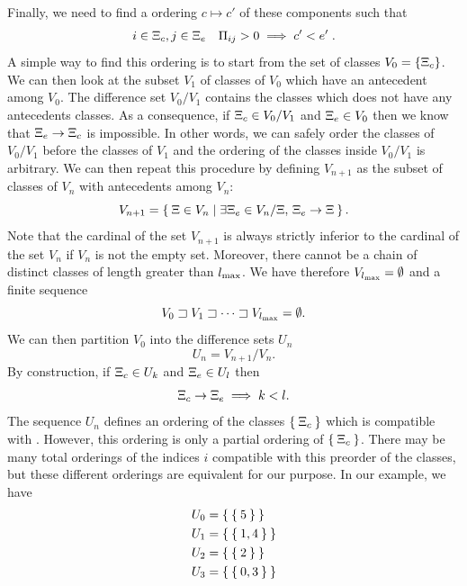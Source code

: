 \documentclass{article}
\begin{document}
Finally,  we need to find a ordering $c \mapsto c'$
of these components such that
\begin{equation} \label{eq:clOrder}
i \in \Xi_{c} , j \in \Xi_{e} \quad \Pi_{ij} > 0 \implies c' < e' \;.
\end{equation}
A simple way to find this ordering is to start from the set of classes $V_0=\{ \Xi_{c} \}$.
We can then look at the subset $V_1$ of classes of $V_0$ which have an antecedent among $V_0$.
The difference set $V_0/V_1$ contains the classes which does not have any antecedents classes.
As a consequence, if $\Xi_{c} \in V_0/V_1$ and $\Xi_{e} \in V_0$ then we know that $\Xi_{e} \rightarrow \Xi_{c}$ is impossible. In other words,
we can safely order the classes of $V_0/V_1$ before the classes of $V_1$ and the ordering of the classes
inside $V_0/V_1$ is arbitrary.  
We can then repeat this procedure by defining $V_{n+1}$ as the subset of classes of $V_n$ with
antecedents among $V_n$:
\begin{equation} \label{eq:app:sseq}
V_{n+1} = \Set{ \Xi  \in V_n | \exists \Xi _e \in V_n/\Xi,\,  \Xi _e \rightarrow  \Xi  }. 
\end{equation}
Note that the cardinal of the set $V_{n+1}$ is always strictly inferior to the cardinal of the set $V_n$
if $V_n$ is not the empty set. Moreover, there cannot be a chain of distinct classes of length greater 
than ${l_{\max}}$.  We have therefore $V_{l_{\max}}= \emptyset$ and a finite sequence 
\begin{equation}
V_0 \sqsupset V_1 \sqsupset \dots \sqsupset V_{l_{\max}} = \emptyset.  
\end{equation}
We can then partition $V_0$ into the difference sets $U_n$
\begin{equation}
  U_n = V_{n+1}/V_n.
\end{equation}
By construction, if $\Xi_{c} \in U_k$ and $\Xi_{e} \in U_l$ then 
\begin{equation}
  \label{eq:app:vseq:prop}
  \Xi_{c} \rightarrow \Xi_{e} \implies k < l.
\end{equation}
The sequence $U_n$ defines an ordering of the classes $\Set{\Xi_{c}}$ which is compatible with 
. However, this ordering is only a partial ordering of $\Set{\Xi_{c}}$.
There may be many total orderings of the indices $i$ compatible with this preorder of the classes, but these different 
orderings are equivalent for our purpose. In our example, we have
\begin{equation} \begin{aligned}
 U_{0} &= \Set{\Set{5}} \\  U_{1} &= \Set{\Set{1,4}} \\  U_{2} &= \Set{\Set{2}} \\  U_{3} &= \Set{\Set{0,3}} \\ 
\end{aligned} \end{equation}
\end{document}
